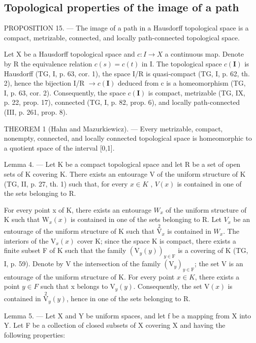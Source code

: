 \subsection{Topological properties of the image of a path}

PROPOSITION 15. --- The image of a path in a Hausdorff topological space is a compact, metrizable, connected, and locally path-connected topological space.

Let X be a Hausdorff topological space and \(c\colon I \to X\) a continuous map. Denote by R the equivalence relation \(c(s) = c(t)\) in I. The topological space \(c(\mathbf{I})\) is Hausdorff (TG, I, p. 63, cor. 1), the space I/R is quasi-compact (TG, I, p. 62, th. 2), hence the bijection I/R \(\to c(\mathbf{I})\) deduced from c is a homeomorphism (TG, I, p. 63, cor. 2). Consequently, the space \(c(\mathbf{I})\) is compact, metrizable (TG, IX, p. 22, prop. 17), connected (TG, I, p. 82, prop. 6), and locally path-connected (III, p. 261, prop. 8).

THEOREM 1 (Hahn and Mazurkiewicz). --- Every metrizable, compact, nonempty, connected, and locally connected topological space is homeomorphic to a quotient space of the interval {[}0,1{]}.

Lemma 4. --- Let K be a compact topological space and let R be a set of open sets of K covering K. There exists an entourage V of the uniform structure of K (TG, II, p. 27, th. 1) such that, for every \(x \in K\) , \(V(x)\) is contained in one of the sets belonging to R.

For every point x of K, there exists an entourage \(W_{x}\) of the uniform structure of K such that \(\mathrm{W}_{x}(x)\) is contained in one of the sets belonging to R. Let \(V_{x}\) be an entourage of the uniform structure of K such that \(\overset{2}{\mathrm{V}}_{x}\) is contained in \(W_{x}\). The interiors of the \(\mathrm{V}_{x}(x)\) cover K; since the space K is compact, there exists a finite subset F of K such that the family \((\mathrm{V}_{y}(y))_{y\in\mathrm{F}}\) is a covering of K (TG, I, p. 59). Denote by V the intersection of the family \((\mathrm{V}_{y})_{y\in\mathrm{F}}\); the set V is an entourage of the uniform structure of K. For every point \(x\in K\), there exists a point \(y\in F\) such that x belongs to \(\mathrm{V}_{y}(y)\). Consequently, the set \(\mathrm{V}(x)\) is contained in \(\overset{2}{\mathrm{V}}_{y}(y)\), hence in one of the sets belonging to R.

Lemma 5. --- Let X and Y be uniform spaces, and let f be a mapping from X into Y. Let F be a collection of closed subsets of X covering X and having the following properties:


